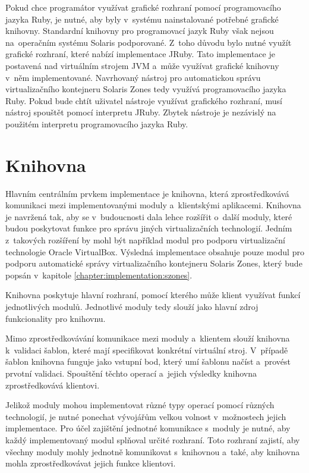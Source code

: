 Pokud chce programátor využívat grafické rozhraní pomocí programovacího jazyka Ruby, je nutné, aby byly v~systému
nainstalované potřebné grafické knihovny. Standardní knihovny pro programovací jazyk Ruby však nejsou na~operačním
systému Solaris podporované. Z~toho důvodu bylo nutné využít grafické rozhraní, které nabízí implementace JRuby.
Tato implementace je postavená nad virtuálním strojem JVM a~může využívat grafické knihovny v~něm implementované.
Navrhovaný nástroj pro automatickou správu virtualizačního kontejneru Solaris Zones tedy využívá programovacího
jazyka Ruby. Pokud bude chtít uživatel nástroje využívat grafického rozhraní, musí nástroj spouštět pomocí
interpretu JRuby. Zbytek nástroje je nezávislý na použitém interpretu programovacího jazyka Ruby.
\section{Knihovna}
\label{chapter:implementation:library}
Hlavním centrálním prvkem implementace je knihovna, která zprostředkovává komunikaci mezi implementovanými moduly
a~klientskými aplikacemi. Knihovna je navržená tak, aby se v~budoucnosti dala lehce rozšířit o~další moduly, které budou
poskytovat funkce pro správu jiných virtualizačních technologií. Jedním z~takových rozšíření by mohl být například modul
pro podporu virtualizační technologie Oracle VirtualBox. Výsledná implementace obsahuje pouze modul pro podporu automatické
správy virtualizačního kontejneru Solaris Zones, který bude popsán v~kapitole \ref{chapter:implementation:szones}.

Knihovna poskytuje hlavní rozhraní, pomocí kterého může klient využívat funkcí jednotlivých modulů. Jednotlivé
moduly tedy slouží jako hlavní zdroj funkcionality pro knihovnu.

Mimo zprostředkovávání komunikace mezi moduly a~klientem slouží kni\-ho\-vna k~validaci šablon, které mají specifikovat
konkrétní virtuální stroj. V~případě šablon knihovna funguje jako vstupní bod, který umí šablonu načíst a~provést
prvotní validaci. Spouštění těchto operací a~jejich výsledky knihovna zprostředkovává klientovi.

Jelikož moduly mohou implementovat různé typy operací pomocí různých technologií, je nutné ponechat vývojářům velkou volnost
v~možnostech jejich implementace. Pro účel zajištění jednotné komunikace s~moduly je nutné, aby každý implementovaný modul
splňoval určité rozhraní. Toto rozhraní zajistí, aby všechny moduly mohly jednotně komunikovat s~knihovnou a~také, aby knihovna
mohla zprostředkovávat jejich funkce klientovi.

